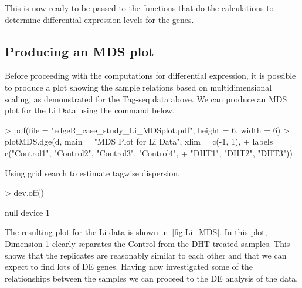 This  is now ready to be passed to the functions that do
the calculations to determine differential expression levels for the
genes.

\subsection{Producing an MDS plot}
Before proceeding with the computations for differential expression,
it is possible to produce a plot showing the sample relations based on
multidimensional scaling, as demonstrated for the Tag-seq data
above. We can produce an MDS plot for the Li Data using the command below.

\begin{Schunk}
\begin{Sinput}
> pdf(file = "edgeR_case_study_Li_MDSplot.pdf", height = 6, width = 6)
> plotMDS.dge(d, main = "MDS Plot for Li Data", xlim = c(-1, 1), 
+     labels = c("Control1", "Control2", "Control3", "Control4", 
+         "DHT1", "DHT2", "DHT3"))
\end{Sinput}
\begin{Soutput}
Using grid search to estimate tagwise dispersion. 
\end{Soutput}
\begin{Sinput}
> dev.off()
\end{Sinput}
\begin{Soutput}
null device 
          1 
\end{Soutput}
\end{Schunk}


The resulting plot for the Li data is shown in~\ref{fig:Li_MDS}. In
this plot, Dimension 1 clearly separates the Control from the
DHT-treated samples. This shows that the replicates are reasonably
similar to each other and that we can expect to find lots of DE
genes. Having now investigated some of the relationships between the
samples we can proceed to the DE analysis of the data.

